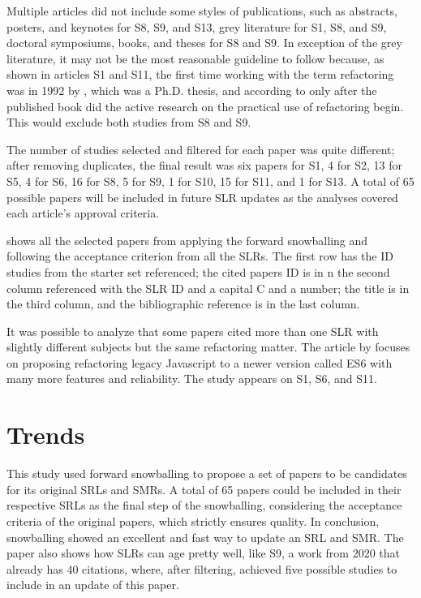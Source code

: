 Multiple articles did not include some styles of publications, such as abstracts, posters, and keynotes for S8, S9, and S13, grey literature for S1, S8, and S9, doctoral symposiums, books, and theses for S8 and S9. In exception of the grey literature, it may not be the most reasonable guideline to follow because, as shown in articles S1 and S11, the first time working with the term refactoring was in 1992 by \textcite{Opdyke1992}, which was a Ph.D. thesis, and according to \textcite{Buriakovskyi2018} only after the published \textcite{fowler2018refactoring} book did the active research on the practical use of refactoring begin. This would exclude both studies from S8 and S9.

The number of studies selected and filtered for each paper was quite different; after removing duplicates, the final result was six papers for S1, 4 for S2, 13 for S5, 4 for S6, 16 for S8, 5 for S9, 1 for S10, 15 for S11, and 1 for S13. A total of 65 possible papers will be included in future SLR updates as the analyses covered each article's approval criteria.

  shows all the selected papers from applying the forward snowballing and following the acceptance criterion from all the SLRs. The first row has the ID studies from the starter set referenced; the cited papers ID is in n the second column referenced with the SLR ID and a capital C and a number; the title is in the third column, and the bibliographic reference is in the last column.



It was possible to analyze that some papers cited more than one SLR with slightly different subjects but the same refactoring matter. The article by \textcite{Paltoglou2021} focuses on proposing refactoring legacy Javascript to a newer version called ES6 with many more features and reliability. The study appears on S1, S6, and S11.


\section{Trends}
\label{sec-trends}
This study used forward snowballing to propose a set of papers to be candidates for its original SRLs and SMRs.
A total of 65 papers could be included in their respective SRLs as the final step of the snowballing, considering the acceptance criteria of the original papers, which strictly ensures quality. In conclusion, snowballing showed an excellent and fast way to update an SRL and SMR.
The paper also shows how SLRs can age pretty well, like S9, a work from 2020 that already has 40 citations, where, after filtering, achieved five possible studies to include in an update of this paper.

